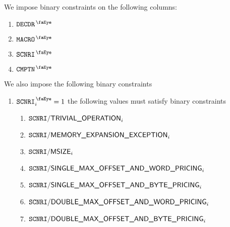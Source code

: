 We impose binary constraints on the following columns:
\begin{multicols}{4}
	\begin{enumerate}
		\item $\isMxpInstructionDecoder$
		\item $\isMxpMacro             $
		\item $\isMxpScenario          $
		\item $\isMxpComputation       $
	\end{enumerate}
\end{multicols}

We also impose the following binary constraints
\begin{enumerate}
	\item \If $\isMxpScenario _{i} = 1$ \Then the following values must satisfy binary constraints
		\begin{enumerate}
			\item $\texttt{SCNRI}\textsf{/}{\textsf{TRIVIAL\_OPERATION}}              _{i}$
			\item $\texttt{SCNRI}\textsf{/}{\textsf{MEMORY\_EXPANSION\_EXCEPTION}}      _{i}$
			\item $\texttt{SCNRI}\textsf{/}{\textsf{MSIZE}}                         _{i}$
			\item $\texttt{SCNRI}\textsf{/}{\textsf{SINGLE\_MAX\_OFFSET\_AND\_WORD\_PRICING}} _{i}$
			\item $\texttt{SCNRI}\textsf{/}{\textsf{SINGLE\_MAX\_OFFSET\_AND\_BYTE\_PRICING}} _{i}$
			\item $\texttt{SCNRI}\textsf{/}{\textsf{DOUBLE\_MAX\_OFFSET\_AND\_WORD\_PRICING}} _{i}$
			\item $\texttt{SCNRI}\textsf{/}{\textsf{DOUBLE\_MAX\_OFFSET\_AND\_BYTE\_PRICING}} _{i}$
		\end{enumerate}
\end{enumerate}
